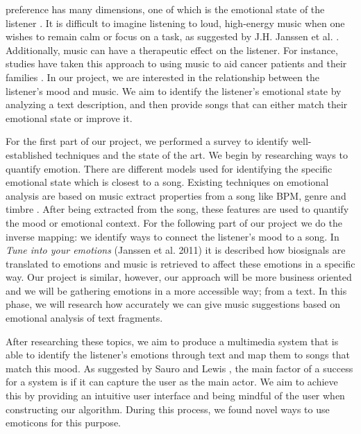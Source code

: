 \documentclass[10pt,journal,compsoc]{IEEEtran}
\begin{document}
% 
% 
% 
% 
 preference has many dimensions, one of which is the emotional state of the listener \cite{Zwaag}. It is difficult to imagine listening to loud, high-energy music when one wishes to remain calm or focus on a task, as suggested by J.H. Janssen et al. \cite{Janssen}. Additionally, music can have a therapeutic effect on the listener. For instance, studies have taken this approach to using music to aid cancer patients and their families \cite{Bailey}. In our project, we are interested in the relationship between the listener's mood and music. We aim to identify the listener's emotional state by analyzing a text description, and then provide songs that can either match their emotional state or improve it.

For the first part of our project, we performed a survey to identify well-established techniques and the state of the art. We begin by researching ways to quantify emotion. There are different models used for identifying the specific emotional state which is closest to a song. Existing techniques on emotional analysis are based on music extract properties from a song like BPM, genre and timbre \cite{Kim}. After being extracted from the song, these features are used to quantify the mood or emotional context. For the following part of our project we do the inverse mapping: we identify ways to connect the listener's mood to a song. In \emph{Tune into your emotions} (Janssen et al. 2011) \cite{Janssen} it is described how biosignals are translated to emotions and music is retrieved to affect these emotions in a specific way. Our project is similar, however, our approach will be more business oriented and we will be gathering emotions in a more accessible way; from a text. In this phase, we will research how accurately we can give music suggestions based on emotional analysis of text fragments.

After researching these topics, we aim to produce a multimedia system that is able to identify the listener's emotions through text and map them to songs that match this mood. As suggested by Sauro and Lewis \cite{Sauro}, the main factor of a success for a system is if it can capture the user as the main actor.  We aim to achieve this by providing an intuitive user interface and being mindful of the user when constructing our algorithm. During this process, we found novel ways to use emoticons for this purpose. 
\end{document}
